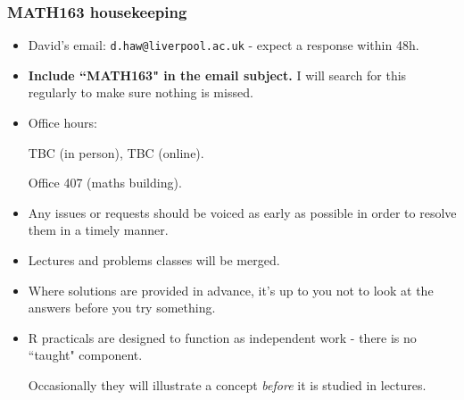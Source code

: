 \documentclass[t,8pt]{beamer}
\begin{document}
	\begin{frame}
		\frametitle{MATH163 housekeeping}
		\begin{itemize}
			\item David's email: \texttt{d.haw@liverpool.ac.uk} - expect a response within 48h.
			\item {\bf Include ``MATH163" in the email subject.} I will search for this regularly to make sure nothing is missed. 
			\item Office hours: \par
			TBC (in person), TBC (online). \par
			Office 407 (maths building).
			\item Any issues or requests should be voiced as early as possible in order to resolve them in a timely manner.
			\item Lectures and problems classes will be merged. 
			\item Where solutions are provided in advance, it's up to you not to look at the answers before you try something.
			\item R practicals are designed to function as independent work - there is no ``taught" component. \par 
			Occasionally they will illustrate a concept {\it before} it is studied in lectures. 
		\end{itemize}
	\end{frame}
	
\end{document}
